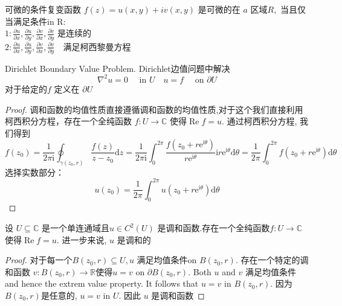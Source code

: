 \documentclass[cn,11pt,chinese,black]{elegantbook}
\begin{document}
	
	\begin{theorem}{可微的条件}\noindent 复变函数 $f(z)=u(x, y)+i v(x, y)$ 是可微的在 $a$ 区域$R,$ 当且仅当满足条件in $\mathrm{R}:$ \\
		$1: \frac{\partial u}{\partial x}, \frac{\partial u}{\partial y}, \frac{\partial v}{\partial x}, \frac{\partial v}{\partial y}$ 是连续的 \\
		$2: \frac{\partial u}{\partial x}, \frac{\partial u}{\partial y}, \frac{\partial v}{\partial x}, \frac{\partial v}{\partial y} \quad$满足柯西黎曼方程
	\end{theorem}
	\begin{definition}{Dirichlet Boundary Value Problem.}
		\noindent Dirichlet边值问题中解决
		$$
		\nabla^{2} u=0 \quad \text { in } U \quad u=f \quad \text { on } \partial U
		$$
		对于给定的$f$ 定义在 $\partial U$
	\end{definition}
	\begin{proof}
		调和函数的均值性质直接遵循调和函数的均值性质,对于这个我们直接利用柯西积分方程，存在一个全纯函数 $f: U \rightarrow \mathbb{C}$ 使得$\operatorname{Re} f=u .$ 通过柯西积分方程, 我们得到
		$$
		f\left(z_{0}\right)=\frac{1}{2 \pi \mathrm{i}} \oint_{\gamma\left(z_{0}, r\right)} \frac{f(z)}{z-z_{0}} \mathrm{d} z=\frac{1}{2 \pi \mathrm{i}} \int_{0}^{2 \pi} \frac{f\left(z_{0}+r \mathrm{e}^{\mathrm{i} \theta}\right)}{r \mathrm{e}^{\mathrm{i} \theta}} \mathrm{i} r \mathrm{e}^{\mathrm{i} \theta} \mathrm{d} \theta=\frac{1}{2 \pi} \int_{0}^{2 \pi} f\left(z_{0}+r \mathrm{e}^{\mathrm{i} \theta}\right) \mathrm{d} \theta
		$$
		选择实数部分：
		$$
		u\left(z_{0}\right)=\frac{1}{2 \pi} \int_{0}^{2 \pi} u\left(z_{0}+r \mathrm{e}^{\mathrm{i} \theta}\right) \mathrm{d} \theta
		$$
	\end{proof}
	\begin{proposition}
		\noindent 设 $U \subseteq \mathbb{C}$ 是一个单连通域且$u \in C^{2}(U)$ 是调和函数.存在一个全纯函数$f: U \rightarrow \mathbb{C}$使得$\operatorname{Re} f=u .$ 进一步来说, $u$ 是调和的
	\end{proposition}
	\begin{proof} 对于每一个$B\left(z_{0}, r\right) \subseteq U, u$ 满足均值条件on $B\left(z_{0}, r\right) .$ 存在一个特定的调和函数 $v: B\left(z_{0}, r\right) \rightarrow \mathbb{R}$使得$u=v$ on $\partial B\left(z_{0}, r\right) .$ Both $u$ and $v$ 满足均值条件 and hence the extrem value property. It follows that $u=v$ in $B\left(z_{0}, r\right)$. 因为 $B\left(z_{0}, r\right)$是任意的, $u=v$ in $U$. 因此 $u$ 是调和函数
	\end{proof}
\end{document}
